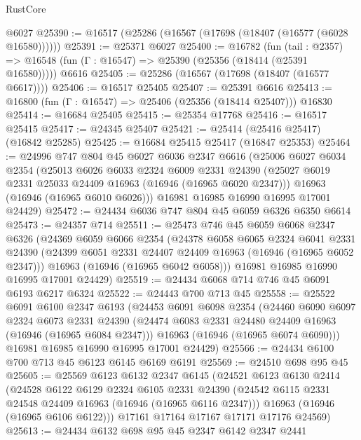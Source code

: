 \begin{lexlean}{RustCore}
\begin{coremodule}
    @6027
@25390 := @16517 (@25286 (@16567 (@17698 (@18407 (@16577 (@6028 @16580))))))
@25391 := @25371 @6027
@25400 := @16782
    (fun (tail : @2357) => @16548 (fun (Γ : @16547) => @25390 (@25356 (@18414 (@25391 @16580)))))
    @6616
@25405 := @25286 (@16567 (@17698 (@18407 (@16577 @6617))))
@25406 := @16517 @25405
@25407 := @25391 @6616
@25413 := @16800 (fun (Γ : @16547) => @25406 (@25356 (@18414 @25407))) @16830
@25414 := @16684 @25405
@25415 := @25354 @17768
@25416 := @16517 @25415
@25417 := @24345 @25407
@25421 := @25414 (@25416 @25417) (@16842 @25285)
@25425 := @16684 @25415 @25417 (@16847 @25353)
@25464 := @24996
    @747
    @804
    @45
    @6027
    @6036
    @2347
    @6616
    (@25006
      @6027
      @6034
      @2354
      (@25013
        @6026
        @6033
        @2324
        @6009
        @2331
        @24390
        (@25027 @6019 @2331 @25033 @24409 @16963 (@16946 (@16965 @6020 @2347)))
        @16963
        (@16946 (@16965 @6010 @6026)))
      @16981
      @16985
      @16990
      @16995
      @17001
      @24429)
@25472 := @24434 @6036 @747 @804 @45 @6059 @6326 @6350 @6614
@25473 := @24357 @714
@25511 := @25473
    @746
    @45
    @6059
    @6068
    @2347
    @6326
    (@24369
      @6059
      @6066
      @2354
      (@24378
        @6058
        @6065
        @2324
        @6041
        @2331
        @24390
        (@24399 @6051 @2331 @24407 @24409 @16963 (@16946 (@16965 @6052 @2347)))
        @16963
        (@16946 (@16965 @6042 @6058)))
      @16981
      @16985
      @16990
      @16995
      @17001
      @24429)
@25519 := @24434 @6068 @714 @746 @45 @6091 @6193 @6217 @6324
@25522 := @24443 @700 @713 @45
@25558 := @25522
    @6091
    @6100
    @2347
    @6193
    (@24453
      @6091
      @6098
      @2354
      (@24460
        @6090
        @6097
        @2324
        @6073
        @2331
        @24390
        (@24474 @6083 @2331 @24480 @24409 @16963 (@16946 (@16965 @6084 @2347)))
        @16963
        (@16946 (@16965 @6074 @6090)))
      @16981
      @16985
      @16990
      @16995
      @17001
      @24429)
@25566 := @24434 @6100 @700 @713 @45 @6123 @6145 @6169 @6191
@25569 := @24510 @698 @95 @45
@25605 := @25569
    @6123
    @6132
    @2347
    @6145
    (@24521
      @6123
      @6130
      @2414
      (@24528
        @6122
        @6129
        @2324
        @6105
        @2331
        @24390
        (@24542 @6115 @2331 @24548 @24409 @16963 (@16946 (@16965 @6116 @2347)))
        @16963
        (@16946 (@16965 @6106 @6122)))
      @17161
      @17164
      @17167
      @17171
      @17176
      @24569)
@25613 := @24434 @6132 @698 @95 @45 @2347 @6142 @2347 @2441

\end{coremodule}
\end{lexlean}
